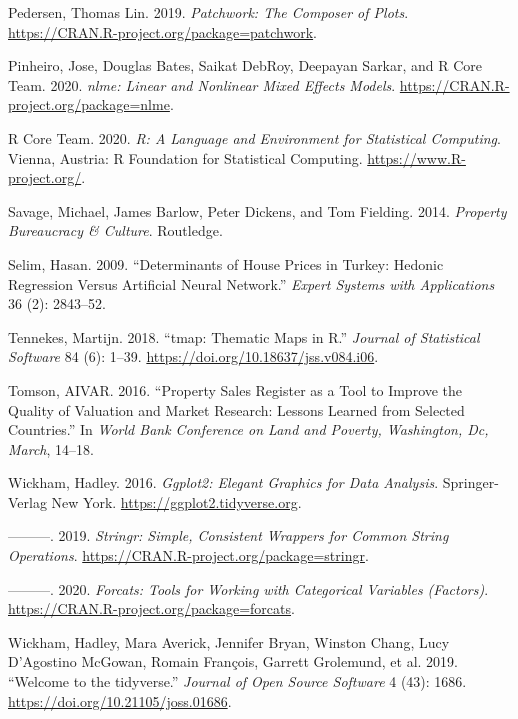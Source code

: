 \documentclass[conference,final,]{IEEEtran}
\newlength{\cslhangindent}
\newenvironment{cslreferences}%
  {\setlength{\parindent}{0pt}%
  \everypar{\setlength{\hangindent}{\cslhangindent}}\ignorespaces}%
  {\par}
\begin{document}
\begin{cslreferences}
\leavevmode\hypertarget{ref-R-patchwork}{}%
Pedersen, Thomas Lin. 2019. \emph{Patchwork: The Composer of Plots}. \url{https://CRAN.R-project.org/package=patchwork}.

\leavevmode\hypertarget{ref-R-nlme}{}%
Pinheiro, Jose, Douglas Bates, Saikat DebRoy, Deepayan Sarkar, and R Core Team. 2020. \emph{nlme: Linear and Nonlinear Mixed Effects Models}. \url{https://CRAN.R-project.org/package=nlme}.

\leavevmode\hypertarget{ref-R-base}{}%
R Core Team. 2020. \emph{R: A Language and Environment for Statistical Computing}. Vienna, Austria: R Foundation for Statistical Computing. \url{https://www.R-project.org/}.

\leavevmode\hypertarget{ref-savage2014property}{}%
Savage, Michael, James Barlow, Peter Dickens, and Tom Fielding. 2014. \emph{Property Bureaucracy \& Culture}. Routledge.

\leavevmode\hypertarget{ref-selim2009determinants}{}%
Selim, Hasan. 2009. ``Determinants of House Prices in Turkey: Hedonic Regression Versus Artificial Neural Network.'' \emph{Expert Systems with Applications} 36 (2): 2843--52.

\leavevmode\hypertarget{ref-R-tmap}{}%
Tennekes, Martijn. 2018. ``tmap: Thematic Maps in R.'' \emph{Journal of Statistical Software} 84 (6): 1--39. \url{https://doi.org/10.18637/jss.v084.i06}.

\leavevmode\hypertarget{ref-tomson2016property}{}%
Tomson, AIVAR. 2016. ``Property Sales Register as a Tool to Improve the Quality of Valuation and Market Research: Lessons Learned from Selected Countries.'' In \emph{World Bank Conference on Land and Poverty, Washington, Dc, March}, 14--18.

\leavevmode\hypertarget{ref-R-ggplot2}{}%
Wickham, Hadley. 2016. \emph{Ggplot2: Elegant Graphics for Data Analysis}. Springer-Verlag New York. \url{https://ggplot2.tidyverse.org}.

\leavevmode\hypertarget{ref-R-stringr}{}%
---------. 2019. \emph{Stringr: Simple, Consistent Wrappers for Common String Operations}. \url{https://CRAN.R-project.org/package=stringr}.

\leavevmode\hypertarget{ref-R-forcats}{}%
---------. 2020. \emph{Forcats: Tools for Working with Categorical Variables (Factors)}. \url{https://CRAN.R-project.org/package=forcats}.

\leavevmode\hypertarget{ref-R-tidyverse}{}%
Wickham, Hadley, Mara Averick, Jennifer Bryan, Winston Chang, Lucy D'Agostino McGowan, Romain François, Garrett Grolemund, et al. 2019. ``Welcome to the tidyverse.'' \emph{Journal of Open Source Software} 4 (43): 1686. \url{https://doi.org/10.21105/joss.01686}.


\end{cslreferences}
\end{document}
